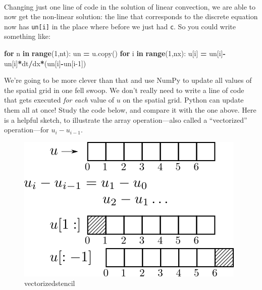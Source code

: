 \documentclass{article}
\newenvironment{Shaded}{}{}
\newcommand{\DecValTok}[1]{\textcolor[rgb]{0.25,0.63,0.44}{{#1}}}
\newcommand{\NormalTok}[1]{{#1}}
\newcommand{\BuiltInTok}[1]{\textcolor[rgb]{0.00,0.44,0.13}{\textbf{{#1}}}}
\newcommand{\OperatorTok}[1]{\textcolor[rgb]{0.00,0.44,0.13}{\textbf{{#1}}}}
\newcommand{\ControlFlowTok}[1]{\textcolor[rgb]{0.00,0.44,0.13}{\textbf{{#1}}}}
\begin{document}
    \begin{center}
    \end{center}
    { \hspace*{\fill} \\}
    
    Changing just one line of code in the solution of linear convection, we
are able to now get the non-linear solution: the line that corresponds
to the discrete equation now has \texttt{un{[}i{]}} in the place where
before we just had \texttt{c}. So you could write something like:

\begin{Shaded}
\begin{Highlighting}[]
\ControlFlowTok{for} \NormalTok{n }\OperatorTok{in} \BuiltInTok{range}\NormalTok{(}\DecValTok{1}\NormalTok{,nt):  }
  \NormalTok{un }\OperatorTok{=} \NormalTok{u.copy() }
  \ControlFlowTok{for} \NormalTok{i }\OperatorTok{in} \BuiltInTok{range}\NormalTok{(}\DecValTok{1}\NormalTok{,nx): }
    \NormalTok{u[i] }\OperatorTok{=} \NormalTok{un[i]}\OperatorTok{-}\NormalTok{un[i]}\OperatorTok{*}\NormalTok{dt}\OperatorTok{/}\NormalTok{dx}\OperatorTok{*}\NormalTok{(un[i]}\OperatorTok{-}\NormalTok{un[i}\DecValTok{-1}\NormalTok{]) }
\end{Highlighting}
\end{Shaded}

We're going to be more clever than that and use NumPy to update all
values of the spatial grid in one fell swoop. We don't really need to
write a line of code that gets executed \emph{for each} value of \(u\)
on the spatial grid. Python can update them all at once! Study the code
below, and compare it with the one above. Here is a helpful sketch, to
illustrate the array operation---also called a ``vectorized''
operation---for \(u_i-u_{i-1}\).

    \begin{figure}[htbp]
\centering
\includegraphics{figures/vectorizedstencil.png}
\caption{vectorizedstencil}
\end{figure}
\end{document}
